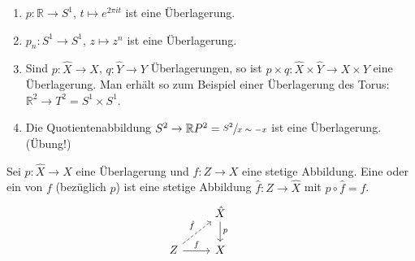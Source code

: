 \begin{beispiel}[{name=[Überlagerungen]}]
	\begin{enumerate}[(1)]
		\item $p \colon \mathbb{R} \to S^1$, $t \mapsto e^{2 \pi  i t}$ ist eine Überlagerung.
		\item $p_n \colon S^1 \to S^1$, $z \mapsto z^n$ ist eine Überlagerung.
		\item Sind $p \colon \hat{X} \to X$, $q : \hat{Y} \to Y$ Überlagerungen, so ist $p \times q \colon \hat{X} \times \hat{Y} \to X \times Y$ eine Überlagerung.
		Man erhält so zum Beispiel einer Überlagerung des Torus: $\mathbb{R}^2 \to T^2 = S^1 \times S^1$.
		\item Die Quotientenabbildung $S^2 \to \mathbb{R}P^2= \sfrac{S^2}{x \sim -x}$ ist eine Überlagerung. \hfill (Übung!)
	\end{enumerate}
\end{beispiel}

\begin{definition}[{name=[Hebung]}]
	Sei $p \colon \hat{X} \to X$ eine Überlagerung und $f \colon Z \to X$ eine stetige Abbildung. 
	Eine  oder ein  von $f$ (bezüglich $p$) ist eine stetige Abbildung $\hat{f} \colon Z \to \hat{X}$ mit $p \circ \hat{f} = f$.
	\[
		\begin{tikzcd}
			&\hat{X} \dar{p}&  \\
			Z \rar{f} \urar[dashed]{\hat{f}} & X
		\end{tikzcd}
	\]
\end{definition}

